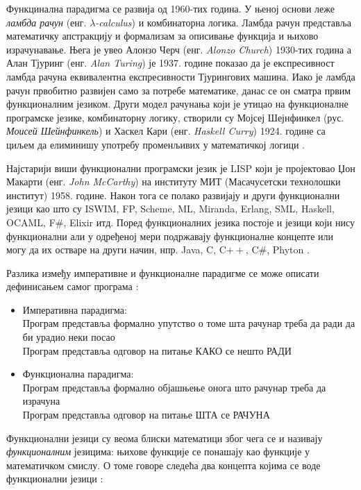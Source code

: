 \documentclass[12pt,oneside]{memoir}
\begin{document}
Функцинална парадигма се развија од 1960-тих година. У њеној основи леже \textit{ламбда рачун} (енг. \textit{$\lambda$-calculus}) и комбинаторна логика. Ламбда рачун представља математичку апстракцију и формализам за описивање функција и њихово израчунавање. Њега је увео Алонзо Черч (енг. \textit{Alonzo Church}) 1930-тих година а Алан Тјуринг (енг. \textit{Alan Turing}) је 1937. године показао да је експресивност ламбда рачуна еквивалентна експресивности Тјурингових машина. Иако је ламбда рачун првобитно развијен само за потребе математике, данас се он сматра првим функционалним језиком. Други модел рачунања који је утицао на функционалне програмске језике, комбинаторну логику, створили су Мојсеј Шејнфинкел (рус. \textit{Моисей Шейнфинкель}) и Хаскел Кари (енг. \textit{Haskell Curry}) 1924. године са циљем да елиминишу употребу променљивих у математичкој логици \cite{funkMilena, history, lambdaRacun, history}.
\par Најстарији виши функционални програмски језик је LISP који је пројектовао Џон Макарти (енг. \textit{John McCarthy}) на институту МИТ (Масачусетски технолошки институт) 1958. године. Након тога се полако развијају и други функционални језици као што су ISWIM, FP, Scheme, ML, Miranda, Erlang, SML, Haskell, OCAML,  F\#, Elixir итд. Поред функционалних језика постоје и језици који нису функционални али  у одређеној мери подржавају функционалне концепте или могу да их остваре на други начин, нпр. Java, C, C$++$, C\#, Phyton  \cite{funkMilena, history}.
\par Разлика између императивне и функционалне парадигме се може описати дефинисањем самог програма \cite{funkMalkov}:
\begin{itemize}
\item Императивна парадигма: 
\\Програм представља формално упутство о томе шта рачунар треба да ради да би урадио неки посао
\\Програм представља одговор на питање КАКО се нешто РАДИ
\item Функционална парадигма:
\\Програм представља формално објашњење онога што рачунар треба да израчуна
\\Програм представља одговор на питање ШТА се РАЧУНА
\end{itemize}
\par Функционални језици су веома блиски математици због чега се и називају \textit{функционалним} језицима: њихове функције се понашају као функције у математичком смислу. О томе говоре следећа два концепта којима се воде функционални језици \cite{progInScala}: 
\end{document}
